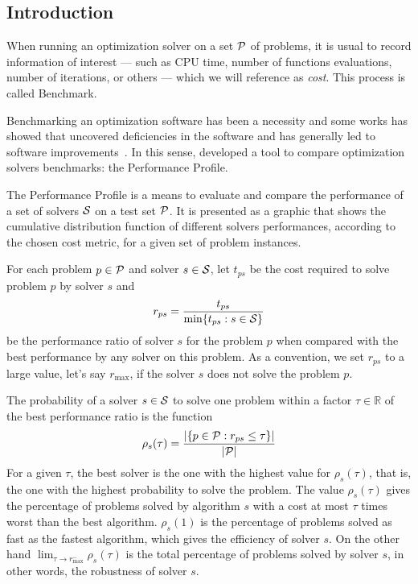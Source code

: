 \subsection*{Introduction}

    When running an optimization solver on a set  $\mathcal{P}$ of problems, it is
    usual to record   information of interest --- such as CPU time, number of
    functions evaluations, number of iterations, or others --- which we will
    reference as \emph{cost}. This process is called Benchmark.

    Benchmarking an optimization software has been a necessity and some works
    has showed that uncovered deficiencies in the software and has generally led
    to software
    improvements~\cite{url:mittelmann,Mittelmann:1999fb,Dolan:2006kl}.
    In this sense, \textcite{Dolan:2002du} developed a tool to compare
    optimization solvers benchmarks: the Performance Profile.

    The Performance Profile is a means to evaluate and compare the performance
    of a set of solvers $\mathcal{S}$ on a test set $\mathcal{P}$. It is presented as a
    graphic that shows the cumulative distribution function of different solvers
    performances, according to the chosen cost metric, for a given set of
    problem instances.

    For each
    problem $p \in \mathcal{P}$ and solver $s \in \mathcal{S}$, let $t_{ps}$ be the
    cost required to solve problem $p$ by solver $s$ and
    \begin{align*}
      r_{ps} = \frac{t_{ps}}{\min\{t_{ps}: s \in \mathcal{S}\}}
    \end{align*}
    be the performance ratio of solver $s$ for the problem $p$ when compared
    with the best performance by any solver on this problem.
    As a convention, we set $r_{ps}$ to a large value, let's say $r_{\max}$, if
    the solver $s$ does not solve the problem $p$.

    The probability of a solver $s \in \mathcal{S}$  to solve one problem within a
    factor $\tau \in \mathds{R}$ of the best performance ratio is the function
    \begin{align*}
      \rho_s(\tau) = \frac{| \{p \in \mathcal{P}: r_{ps} \leq \tau\} |}{| \mathcal{P} |}
    \end{align*}
    For a given $\tau$, the best solver is the one with the highest value for
    $\rho_s(\tau)$, that is, the one with the highest probability to solve the
    problem.
    The value $\rho_s(\tau)$ gives the percentage of problems solved by
    algorithm $s$ with a cost at most $\tau$ times worst than the best
    algorithm. $\rho_s(1)$ is the percentage of problems solved as fast as the
    fastest algorithm, which gives the efficiency of solver $s$.
    On the other hand $\displaystyle \lim_{\tau\rightarrow r^-_{\max}}
    \rho_s(\tau)$ is the total percentage of problems solved by solver $s$, in
    other words, the robustness of solver $s$.

